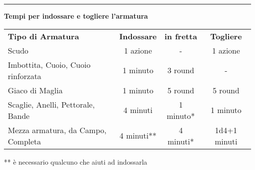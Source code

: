 \documentclass[a4paper,12 pt,openany]{book}
\newcommand{\riga}{\rule{\textwidth}{0.4pt}}
\begin{document}
\begin{textblock*}{18cm}
\riga

\textbf{Tempi per indossare e togliere l'armatura}\\

\begin{tabular}{lccc}
\textbf{Tipo di Armatura}& \textbf{Indossare} & \textbf{in fretta} & \textbf{Togliere}\\
Scudo								& 1 azione 	& -     	& 1 azione\\
Imbottita, Cuoio, Cuoio rinforzata  & 1 minuto	& 3 round  	& - \\
Giaco di Maglia						& 1 minuto	& 5 round  & 5 round\\
Scaglie, Anelli, Pettorale, Bande   & 4 minuti 	& 1 minuto{*}  & 1 minuto\\
Mezza armatura, da Campo, Completa  & 4 minuti{*}{*}& 4 minuti{*}& 1d4+1 minuti\\
\end{tabular}
\medskip

** è necessario qualcuno che aiuti ad indossarla

\end{textblock*}
\end{document}
